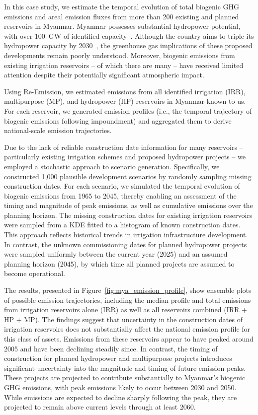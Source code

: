 \documentclass[final,1p,times]{elsarticle}
\begin{document}
In this case study, we estimate the temporal evolution of total biogenic \ac{GHG} emissions and areal emission fluxes from more than 200 existing and planned reservoirs in Myanmar. 
Myanmar possesses substantial hydropower potential, with over 100~GW of identified capacity~\citep{EA_Myanmar}.
Although the country aims to triple its hydropower capacity by 2030~\citep{Aung2020}, the greenhouse gas implications of these proposed developments remain poorly understood. 
Moreover, biogenic emissions from existing irrigation reservoirs -- of which there are many -- have received limited attention despite their potentially significant atmospheric impact.

Using Re-Emission, we estimated emissions from all identified irrigation (IRR), multipurpose (MP), and hydropower (HP) reservoirs in Myanmar known to us. 
For each reservoir, we generated emission profiles (i.e., the temporal trajectory of biogenic emissions following impoundment) and aggregated them to derive national-scale emission trajectories.

Due to the lack of reliable construction date information for many reservoirs -- particularly existing irrigation schemes and proposed hydropower projects -- we employed a stochastic approach to scenario generation. 
Specifically, we constructed 1,000 plausible development scenarios by randomly sampling missing construction dates.
For each scenario, we simulated the temporal evolution of biogenic emissions from 1965 to 2045, thereby enabling an assessment of the timing and magnitude of peak emissions, as well as cumulative emissions over the planning horizon.
The missing construction dates for existing irrigation reservoirs were sampled from a \acf{KDE} fitted to a histogram of known construction dates.
This approach reflects historical trends in irrigation infrastructure development.
In contrast, the unknown commissioning dates for planned hydropower projects were sampled uniformly between the current year (2025) and an assumed planning horizon (2045), by which time all planned projects are assumed to become operational.

The results, presented in Figure~\ref{fig:mya_emission_profile}, show ensemble plots of possible emission trajectories, including the median profile and total emissions from irrigation reservoirs alone (IRR) as well as all reservoirs combined (IRR + HP + MP).
The findings suggest that uncertainty in the construction dates of irrigation reservoirs does not substantially affect the national emission profile for this class of assets. 
Emissions from these reservoirs appear to have peaked around 2005 and have been declining steadily since.
In contrast, the timing of construction for planned hydropower and multipurpose projects introduces significant uncertainty into the magnitude and timing of future emission peaks.
These projects are projected to contribute substantially to Myanmar’s biogenic \ac{GHG} emissions, with peak emissions likely to occur between 2030 and 2050.
While emissions are expected to decline sharply following the peak, they are projected to remain above current levels through at least 2060.
\end{document}
